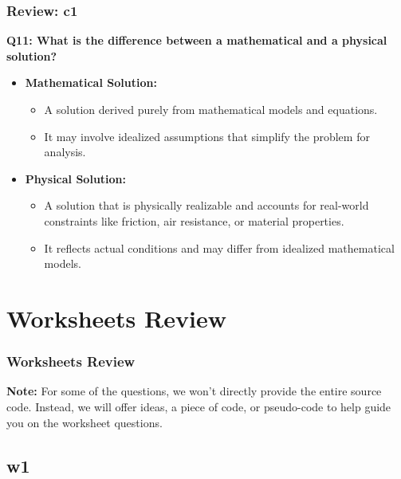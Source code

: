 \documentclass[
	11pt, %
]{beamer}
\begin{document}



\begin{frame}
	\frametitle{Review: c1}

	\textbf{Q11: What is the difference between a mathematical and a physical solution?}

	\begin{itemize}
	    \item \textbf{Mathematical Solution:}
	    \begin{itemize}
	        \item A solution derived purely from mathematical models and equations. 
            \item It may involve idealized assumptions that simplify the problem for analysis.
	    \end{itemize}
	    
	    \item \textbf{Physical Solution:}
	    \begin{itemize}
	        \item A solution that is physically realizable and accounts for real-world constraints like friction, air resistance, or material properties.
            \item It reflects actual conditions and may differ from idealized mathematical models.
	    \end{itemize}
	\end{itemize}

\end{frame}


\section{Worksheets Review}

\begin{frame}
	\frametitle{Worksheets Review}

	\noindent
    \textbf{Note:} For some of the questions, we won't directly provide the entire source code. Instead, we will offer ideas, a piece of code, or pseudo-code to help guide you on the worksheet questions.



\end{frame}


\subsection{w1}
\end{document}
